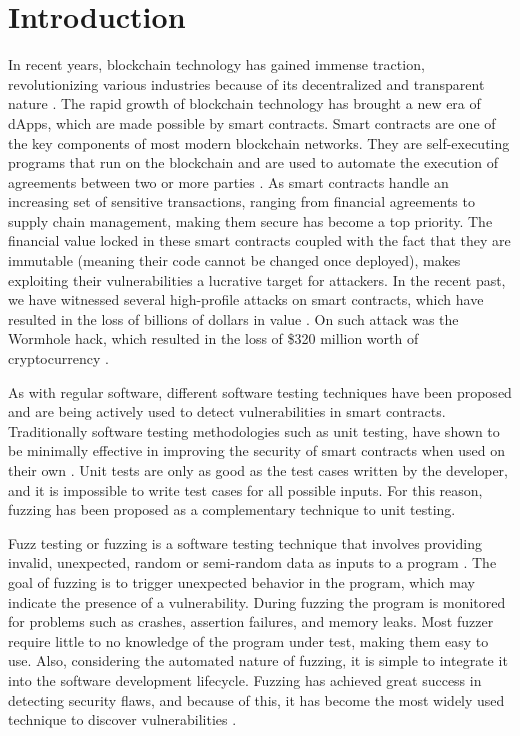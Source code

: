 
\chapter{Introduction}\label{chapter:introduction}
In recent years, blockchain technology has gained immense traction, revolutionizing various industries because of its decentralized and transparent nature \cite{noauthor_global_nodate}.
The rapid growth of blockchain technology has brought a new era of \acp{dApp}, which are made possible by smart contracts.
Smart contracts are one of the key components of most modern blockchain networks.
They are self-executing programs that run on the blockchain and are used to automate the execution of agreements between two or more parties \cite{zou_smart_2021}.
As smart contracts handle an increasing set of sensitive transactions, ranging from financial agreements to supply chain management, making them secure has become a top priority.
The financial value locked in these smart contracts coupled with the fact that they are immutable (meaning their code cannot be changed once deployed), makes exploiting their vulnerabilities a lucrative target for attackers.
In the recent past, we have witnessed several high-profile attacks on smart contracts, which have resulted in the loss of billions of dollars in value  \cite{noauthor_funds_nodate}.
On such attack was the Wormhole hack, which resulted in the loss of \$320 million worth of cryptocurrency \cite{faife_wormhole_2022}.

As with regular software, different software testing techniques have been proposed and are being actively used to detect vulnerabilities in smart contracts.
Traditionally software testing methodologies such as unit testing, have shown to be minimally effective in improving the security of smart contracts when used on their own \cite{noauthor_smart_nodate}.
Unit tests are only as good as the test cases written by the developer, and it is impossible to write test cases for all possible inputs.
For this reason, fuzzing has been proposed as a complementary technique to unit testing.

Fuzz testing or fuzzing is a software testing technique that involves providing invalid, unexpected, random or semi-random data as inputs to a program \cite{manes_art_2019}.
The goal of fuzzing is to trigger unexpected behavior in the program, which may indicate the presence of a vulnerability.
During fuzzing the program is monitored for problems such as crashes, assertion failures, and memory leaks.
Most fuzzer require little to no knowledge of the program under test, making them easy to use.
Also, considering the automated nature of fuzzing, it is simple to integrate it into the software development lifecycle.
Fuzzing has achieved great success in detecting security flaws, and because of this, it has become the most widely used technique to discover vulnerabilities \cite{li_fuzzing_2018, zhu_fuzzing_2022}.

